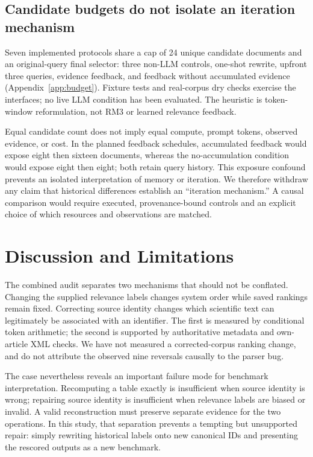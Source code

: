 \subsection{Candidate budgets do not isolate an iteration mechanism}
Seven implemented protocols share a cap of 24 unique candidate documents and an original-query final selector: three non-LLM controls, one-shot rewrite, upfront three queries, evidence feedback, and feedback without accumulated evidence (Appendix~\ref{app:budget}). Fixture tests and real-corpus dry checks exercise the interfaces; no live LLM condition has been evaluated. The heuristic is token-window reformulation, not RM3 or learned relevance feedback.

Equal candidate count does not imply equal compute, prompt tokens, observed evidence, or cost. In the planned feedback schedules, accumulated feedback would expose eight then sixteen documents, whereas the no-accumulation condition would expose eight then eight; both retain query history. This exposure confound prevents an isolated interpretation of memory or iteration. We therefore withdraw any claim that historical differences establish an ``iteration mechanism.'' A causal comparison would require executed, provenance-bound controls and an explicit choice of which resources and observations are matched.

\section{Discussion and Limitations}
The combined audit separates two mechanisms that should not be conflated. Changing the supplied relevance labels changes system order while saved rankings remain fixed. Correcting source identity changes which scientific text can legitimately be associated with an identifier. The first is measured by conditional token arithmetic; the second is supported by authoritative metadata and own-article XML checks. We have not measured a corrected-corpus ranking change, and do not attribute the observed nine reversals causally to the parser bug.

The case nevertheless reveals an important failure mode for benchmark interpretation. Recomputing a table exactly is insufficient when source identity is wrong; repairing source identity is insufficient when relevance labels are biased or invalid. A valid reconstruction must preserve separate evidence for the two operations. In this study, that separation prevents a tempting but unsupported repair: simply rewriting historical labels onto new canonical IDs and presenting the rescored outputs as a new benchmark.

